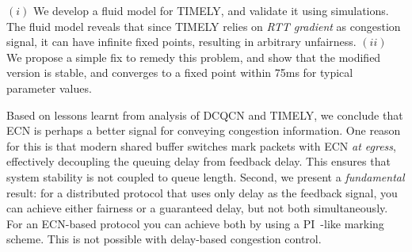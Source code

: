  $(i)$ We develop a fluid model for TIMELY, and validate it using
simulations. The fluid model reveals that since TIMELY relies on {\em RTT
gradient} as congestion signal, it can have infinite fixed points, resulting in
arbitrary unfairness.  $(ii)$ We propose a simple fix to remedy this problem,
and show that the modified version is stable, and converges to a fixed point
within 75ms for typical parameter values.

 Based on lessons learnt from analysis of DCQCN and TIMELY,
we conclude that ECN is perhaps a better signal for conveying congestion
information. One reason for this is that modern shared buffer switches mark
packets with ECN {\em at egress}, effectively decoupling the queuing delay from
feedback delay. This ensures that system stability is not coupled to queue
length. Second, we present a \emph{fundamental} result: for a distributed
protocol that uses only delay as the feedback signal, you can achieve either
fairness or a guaranteed delay, but not both simultaneously. For an ECN-based
protocol you can achieve both by using a
PI~\cite{hollot2001designing}-like marking scheme. This is not possible with
delay-based congestion control.



